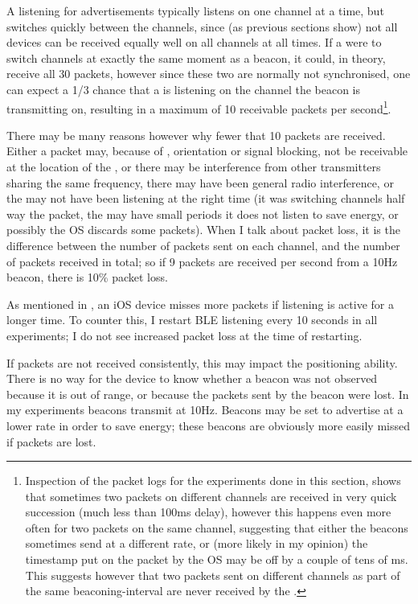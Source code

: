 A \device listening for advertisements typically listens on one channel at a time, but switches quickly between the channels, since (as previous sections show) not all devices can be received equally well on all channels at all times.
If a \device were to switch channels at exactly the same moment as a beacon, it could, in theory, receive all 30 packets, however since these two are normally not synchronised, one can expect a 1/3 chance that a \device is listening on the channel the beacon is transmitting on, resulting in a maximum of 10 receivable packets per second\footnote{Inspection of the packet logs for the experiments done in this section, shows that sometimes two packets on different channels are received in very quick succession (much less than 100ms delay), however this happens even more often for two packets on the same channel, suggesting that either the beacons sometimes send at a different rate, or (more likely in my opinion) the timestamp put on the packet by the OS may be off by a couple of tens of ms. This suggests however that two packets sent on different channels as part of the same beaconing-interval are never received by the \device.}.

There may be many reasons however why fewer that 10 packets are received.
Either a packet may, because of \mpi, orientation or signal blocking, not be receivable at the location of the \device, or there may be interference from other transmitters sharing the same frequency, there may have been general radio interference, or the \device may not have been listening at the right time (it was switching channels half way the packet, the \device may have small periods it does not listen to save energy, or possibly the OS discards some packets).
When I talk about packet loss, it is the difference between the number of packets sent on each channel, and the number of packets received in total; so if 9 packets are received per second from a 10Hz beacon, there is 10\% packet loss.

As mentioned in , an iOS device misses more packets if \BLE listening is active for a longer time.
To counter this, I restart BLE listening every 10 seconds in all experiments; I do not see increased packet loss at the time of restarting.

If packets are not received consistently, this may impact the positioning ability.
There is no way for the device to know whether a beacon was not observed because it is out of range, or because the packets sent by the beacon were lost.
In my experiments beacons transmit at 10Hz.
Beacons may be set to advertise at a lower rate in order to save energy; these beacons are obviously more easily missed if packets are lost.

